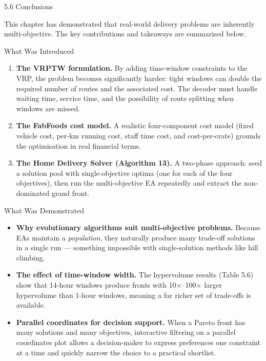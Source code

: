 \documentclass[aspectratio=169,10pt]{beamer}
\begin{document}
\begin{frame}[allowframebreaks]{5.6 Conclusions}

  This chapter has demonstrated that real-world delivery problems are
  inherently multi-objective.  The key contributions and takeaways are
  summarised below.

  \begin{block}{What Was Introduced}
    \begin{enumerate}
      \item \textbf{The VRPTW formulation.}  By adding time-window
            constraints to the VRP, the problem becomes significantly harder:
            tight windows can double the required number of routes and the
            associated cost.  The decoder must handle waiting time, service
            time, and the possibility of route splitting when windows are
            missed.
      \item \textbf{The FabFoods cost model.}  A realistic four-component
            cost model (fixed vehicle cost, per-km running cost, staff time
            cost, and cost-per-crate) grounds the optimisation in real
            financial terms.
      \item \textbf{The Home Delivery Solver (Algorithm 13).}  A two-phase
            approach: seed a solution pool with single-objective optima
            (one for each of the four objectives), then run the
            multi-objective EA repeatedly and extract the non-dominated
            grand front.
    \end{enumerate}
  \end{block}

\framebreak

  \begin{block}{What Was Demonstrated}
    \begin{itemize}
      \item \textbf{Why evolutionary algorithms suit multi-objective
            problems.}  Because EAs maintain a \emph{population}, they
            naturally produce many trade-off solutions in a single run —
            something impossible with single-solution methods like hill
            climbing.
      \item \textbf{The effect of time-window width.}  The hypervolume
            results (Table 5.6) show that 14-hour windows produce fronts
            with 10$\times$--100$\times$ larger hypervolume than 1-hour
            windows, meaning a far richer set of trade-offs is available.
      \item \textbf{Parallel coordinates for decision support.}  When a
            Pareto front has many solutions and many objectives, interactive
            filtering on a parallel coordinates plot allows a decision-maker
            to express preferences one constraint at a time and quickly
            narrow the choice to a practical shortlist.
    \end{itemize}
  \end{block}


\end{frame}
\end{document}
